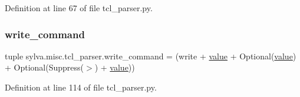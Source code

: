 Definition at line 67 of file tcl\+\_\+parser.\+py.

\mbox{\label{namespacesylva_1_1misc_1_1tcl__parser_a6ce51189f962d0d4e7cdcf224371100c}} 
\subsubsection{\texorpdfstring{write\+\_\+command}{write\_command}}
{\footnotesize\ttfamily tuple sylva.\+misc.\+tcl\+\_\+parser.\+write\+\_\+command = (write + \hyperlink{namespacesylva_1_1misc_1_1tcl__parser_a83a1a4d978bc1a8a1bd92f71b754bad9}{value} + Optional(\hyperlink{namespacesylva_1_1misc_1_1tcl__parser_a83a1a4d978bc1a8a1bd92f71b754bad9}{value}) + Optional(Suppress(\textquotesingle{}$>$\textquotesingle{}) + \hyperlink{namespacesylva_1_1misc_1_1tcl__parser_a83a1a4d978bc1a8a1bd92f71b754bad9}{value}))}



Definition at line 114 of file tcl\+\_\+parser.\+py.

